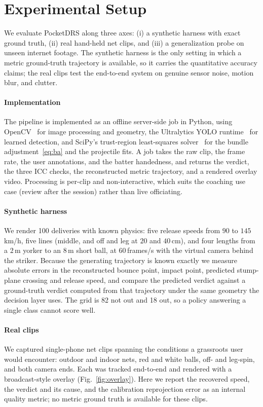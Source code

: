 \documentclass[journal]{IEEEtran}
\begin{document}
\section{Experimental Setup}
\label{sec:setup}

We evaluate PocketDRS along three axes: (i) a synthetic harness with exact
ground truth, (ii) real hand-held net clips, and (iii) a generalization probe on
unseen internet footage. The synthetic harness is the only setting in which a
metric ground-truth trajectory is available, so it carries the quantitative
accuracy claims; the real clips test the end-to-end system on genuine sensor
noise, motion blur, and clutter.

\paragraph*{Implementation} The pipeline is implemented as an offline
server-side job in Python, using OpenCV~\cite{bradski2000opencv} for image
processing and geometry, the Ultralytics YOLO
runtime~\cite{jocher2023ultralytics} for learned detection, and SciPy's
trust-region least-squares solver~\cite{virtanen2020scipy} for the bundle
adjustment~\eqref{eq:ba} and the projectile fits. A job takes the raw clip, the
frame rate, the user annotations, and the batter handedness, and returns the
verdict, the three ICC checks, the reconstructed metric trajectory, and a
rendered overlay video. Processing is per-clip and non-interactive, which suits
the coaching use case (review after the session) rather than live officiating.

\paragraph*{Synthetic harness} We render 100 deliveries with known physics: five
release speeds from $90$ to $145$\,km/h, five lines (middle, and off and leg at
$20$ and $40$\,cm), and four lengths from a $2$\,m yorker to an $8$\,m short
ball, at $60$\,frames/s with the virtual camera behind the striker. Because the
generating trajectory is known exactly we measure absolute errors in the
reconstructed bounce point, impact point, predicted stump-plane crossing and
release speed, and compare the predicted verdict against a ground-truth verdict
computed from that trajectory under the same geometry the decision layer uses.
The grid is 82 not out and 18 out, so a policy answering a single class cannot
score well.

\paragraph*{Real clips} We captured single-phone net clips spanning the
conditions a grassroots user would encounter: outdoor and indoor nets, red and
white balls, off- and leg-spin, and both camera ends. Each was tracked
end-to-end and rendered with a broadcast-style overlay
(Fig.~\ref{fig:overlay}). Here we report the recovered speed, the verdict and
its cause, and the calibration reprojection error as an internal quality metric;
no metric ground truth is available for these clips.
\end{document}
